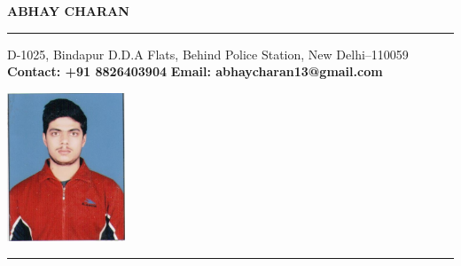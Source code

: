 \documentclass[11pt,a4paper]{article}
\begin{document}
\begin{center}
\begin{large}
\textbf{ABHAY CHARAN}
\end{large}
\end{center}
\hrule
\begin{multicols}{2}
	\begin{minipage}{.4\paperwidth}
		\begin{flushleft}
			\hfill
			\linebreak
			\hfill
			\linebreak
			\hfill
			\linebreak
			D-1025,
			\linebreak
			Bindapur D.D.A Flats,
			\linebreak
			Behind Police Station,
			\linebreak
			New Delhi--110059
			\linebreak
			\hfill
			\linebreak
			\textbf{Contact: +91 8826403904}
			\linebreak
			\textbf{Email: abhaycharan13@gmail.com}
		\end{flushleft}
	\end{minipage}
	\begin{minipage}{.4\paperwidth}
		\begin{flushright}
			\includegraphics[width=100pt]{"abhayphoto"}
			\linebreak
		\end{flushright}
	\end{minipage}
\end{multicols}
\hrule
\end{document}
